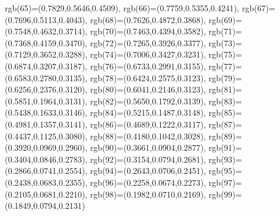 {{        rgb(65)=(0.7829,0.5646,0.4509),
        rgb(66)=(0.7759,0.5355,0.4241),
        rgb(67)=(0.7696,0.5113,0.4043),
        rgb(68)=(0.7626,0.4872,0.3868),
        rgb(69)=(0.7548,0.4632,0.3714),
        rgb(70)=(0.7463,0.4394,0.3582),
        rgb(71)=(0.7368,0.4159,0.3470),
        rgb(72)=(0.7265,0.3926,0.3377),
        rgb(73)=(0.7129,0.3652,0.3288),
        rgb(74)=(0.7006,0.3427,0.3231),
        rgb(75)=(0.6874,0.3207,0.3187),
        rgb(76)=(0.6733,0.2991,0.3155),
        rgb(77)=(0.6583,0.2780,0.3135),
        rgb(78)=(0.6424,0.2575,0.3123),
        rgb(79)=(0.6256,0.2376,0.3120),
        rgb(80)=(0.6041,0.2146,0.3123),
        rgb(81)=(0.5851,0.1964,0.3131),
        rgb(82)=(0.5650,0.1792,0.3139),
        rgb(83)=(0.5438,0.1633,0.3146),
        rgb(84)=(0.5215,0.1487,0.3148),
        rgb(85)=(0.4981,0.1357,0.3141),
        rgb(86)=(0.4689,0.1222,0.3117),
        rgb(87)=(0.4437,0.1125,0.3080),
        rgb(88)=(0.4180,0.1042,0.3028),
        rgb(89)=(0.3920,0.0969,0.2960),
        rgb(90)=(0.3661,0.0904,0.2877),
        rgb(91)=(0.3404,0.0846,0.2783),
        rgb(92)=(0.3154,0.0794,0.2681),
        rgb(93)=(0.2866,0.0741,0.2554),
        rgb(94)=(0.2643,0.0706,0.2451),
        rgb(95)=(0.2438,0.0683,0.2355),
        rgb(96)=(0.2258,0.0674,0.2273),
        rgb(97)=(0.2105,0.0681,0.2210),
        rgb(98)=(0.1982,0.0710,0.2169),
        rgb(99)=(0.1849,0.0794,0.2131)
    }
}
